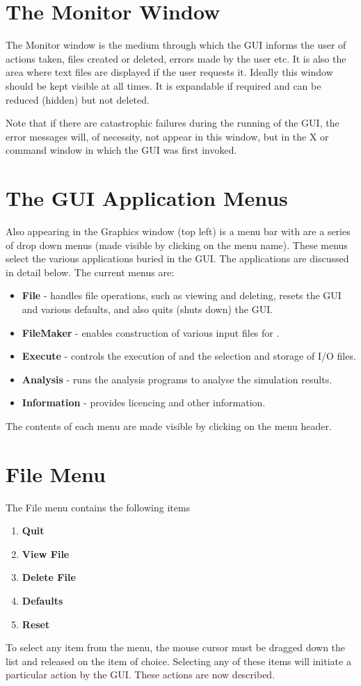 \section{The Monitor Window}

The Monitor window is the medium through which the GUI informs the
user of actions taken, files created or deleted, errors made by
the user etc. It is also the area where text files are displayed if
the user requests it. Ideally this window should be kept visible at
all times. It is expandable if required and can be reduced (hidden)
but not deleted.

Note that if there are catastrophic failures during the running of the
GUI, the error messages will, of necessity, not appear in this window,
but in the X or command window in which the GUI was first invoked.

\section{The GUI Application Menus}

Also appearing in the Graphics window (top left) is a menu bar with
are a series of drop down menus (made visible by clicking on the menu
name). These menus select the various applications buried in the
GUI. The applications are discussed in detail below. The current menus
are:
\begin{itemize}
\item {\bf File} - handles file operations, such as viewing and
deleting, resets the GUI and various defaults, and also quits (shuts
down) the GUI.
\item {\bf FileMaker} - enables construction of various input
files for \DD{}. 
\item {\bf Execute} - controls the execution of \DD{} and the selection and
storage of I/O files.
\item {\bf Analysis} - runs the \DD{} analysis programs to analyse the
simulation results.
\item{\bf Information} - provides licencing and other information.
\end{itemize}

The contents of each menu are made visible by clicking on the menu
header.

\section{File Menu}

The File menu contains the following items
\begin{enumerate}
\item {\bf Quit}
\item {\bf View File}
\item {\bf Delete File}
\item {\bf Defaults}
\item {\bf Reset}
\end{enumerate}
To select any item from the menu, the mouse cursor must be dragged
down the list and released on the item of choice.  Selecting any of
these items will initiate a particular action by the GUI. These
actions are now described.

